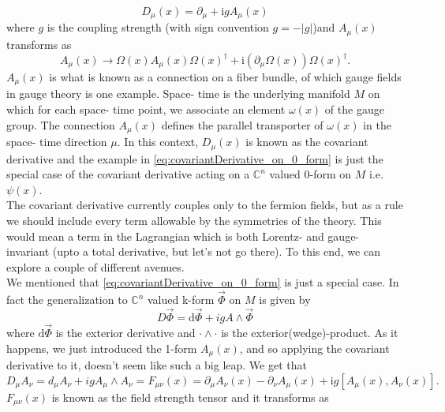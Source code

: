\documentclass[a4paper,10pt]{book}
\begin{document}
\begin{equation}\label{eq:covariantDerivative_on_0_form}
D_{\mu}(x) = \partial_{\mu}+\mathrm{i}g A_{\mu}(x)
\end{equation}
where $g$ is the coupling strength (with sign convention $g=-|g|$)and $A_{\mu}(x)$ transforms as 
\begin{equation}
A_{\mu}(x) \rightarrow \Omega(x) A_{\mu}(x) \Omega(x)^{\dagger}+\mathrm{i}\left(\partial_{\mu} \Omega(x)\right) \Omega(x)^{\dagger}.
\end{equation}
$A_{\mu}(x)$ is what is known as a connection on a fiber bundle, of which gauge fields in gauge theory is one example. Space- time is the underlying manifold $M$ on which for each space- time point, we associate an element $\omega(x)$ of the gauge group. The connection $A_{\mu}(x)$ defines the parallel transporter of $\omega(x)$ in the space- time direction $\mu$. In this context, $D_{\mu}(x)$ is known as the covariant derivative and the example in \eqref{eq:covariantDerivative_on_0_form} is just the special case of the covariant derivative acting on a $\mathbb{C}^n$ valued 0-form on $M$ i.e. $\psi(x)$.\\The covariant derivative currently couples only to the fermion fields, but as a rule we should include every term allowable by the symmetries of the theory. This would mean a term in the Lagrangian which is both Lorentz- and gauge- invariant (upto a total derivative, but let's not go there). To this end, we can explore a couple of different avenues.\\We mentioned that \eqref{eq:covariantDerivative_on_0_form} is just a special case. In fact the generalization to $\mathbb{C}^n$ valued k-form $\vec{\Phi}$ on $M$ is given by
\begin{equation}
D \vec{\Phi}=\mathrm{d} \vec{\Phi}+i g A \wedge \vec{\Phi}
\end{equation}
where $\mathrm{d} \vec{\Phi}$ is the exterior derivative and $\cdot \wedge\cdot$ is the exterior(wedge)-product.
As it happens, we just introduced the 1-form $A_{\mu}(x)$, and so applying the covariant derivative to it, doesn't seem like such a big leap. We get that
\begin{equation}\label{eq:covariantDerivative_on_1_form}
D_\mu A_{\nu}= d_\mu A_{\nu} + igA_{\mu} \wedge A_{\nu} =F_{\mu \nu}(x)=\partial_{\mu} A_{\nu}(x)-\partial_{\nu} A_{\mu}(x)+\mathrm{i}g\left[A_{\mu}(x), A_{\nu}(x)\right].
\end{equation}
$F_{\mu \nu}(x)$ is known as the field strength tensor and it transforms as
\end{document}
